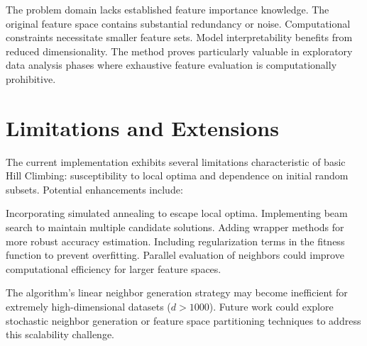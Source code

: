 \documentclass{report}
\begin{document}
	The problem domain lacks established feature importance knowledge. The original feature space contains substantial redundancy or noise. Computational constraints necessitate smaller feature sets. Model interpretability benefits from reduced dimensionality. The method proves particularly valuable in exploratory data analysis phases where exhaustive feature evaluation is computationally prohibitive.
	
	\section{Limitations and Extensions}
	The current implementation exhibits several limitations characteristic of basic Hill Climbing: susceptibility to local optima and dependence on initial random subsets. Potential enhancements include:
	
	Incorporating simulated annealing to escape local optima. Implementing beam search to maintain multiple candidate solutions. Adding wrapper methods for more robust accuracy estimation. Including regularization terms in the fitness function to prevent overfitting. Parallel evaluation of neighbors could improve computational efficiency for larger feature spaces.
	
	The algorithm's linear neighbor generation strategy may become inefficient for extremely high-dimensional datasets ($d > 1000$). Future work could explore stochastic neighbor generation or feature space partitioning techniques to address this scalability challenge.
	
	
	
\end{document}
